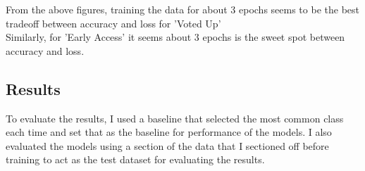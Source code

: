 \documentclass[11pt]{article} %
\begin{document}
\begin{figure}[h]
\centering
{}
\qquad
{}
\end{figure}
From the above figures,  training the data for about 3 epochs seems to be the best tradeoff between accuracy and loss for 'Voted Up'
\\ Similarly,  for 'Early Access' it seems about 3 epochs is the sweet spot between accuracy and loss.
\subsection{Results}
To evaluate the results,  I used a baseline that selected the most common class each time and set that as the baseline for performance of the models. I also evaluated the models using a section of the data that I sectioned off before training to act as the test dataset for evaluating the results.
\end{document}

